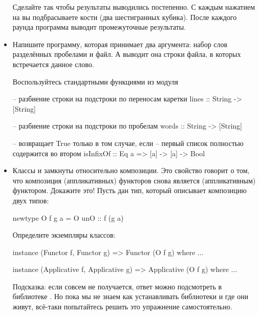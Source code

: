 \begin{itemize}
  Сделайте так чтобы результаты выводились постепенно. С каждым нажатием
  на  вы подбрасываете кости (два шестигранных кубика). После
  каждого раунда программа выводит промежуточные результаты.
\item
  Напишите программу, которая принимает два аргумента: набор слов
  разделённых пробелами и файл. А выводит она строки файла, в которых
  встречается данное слово.

  Воспользуйтесь стандартными функциями из модуля 


  \begin{code}
  -- разбиение строки на подстроки по переносам каретки
  lines :: String -> [String]

  -- разбиение строки на подстроки по пробелам
  words :: String -> [String]

  -- возвращает True только в том случае, если 
  -- первый список полностью содержится во втором
  isInfixOf :: Eq a => [a] -> [a] -> Bool
  \end{code}
\item
  Классы  и  замкнуты относительно
  композиции. Это свойство говорит о том, что композиция (аппликативных)
  функторов снова является (аппликативным) функтором. Докажите это!
  Пусть дан тип, который описывает композицию двух типов:


  \begin{code}
  newtype O f g a = O { unO :: f (g a) }
  \end{code}

  Определите экземпляры классов:


  \begin{code}
  instance (Functor f, Functor g) => Functor (O f g) where ...

  instance (Applicative f, Applicative g) => Applicative (O f g) where ...
  \end{code}

  Подсказка: если совсем не получается, ответ можно подсмотреть в
  библиотеке . Но пока мы не знаем как устанавливать
  библиотеки и где они живут, всё-таки попытайтесь решить это упражнение
  самостоятельно.
\end{itemize}
